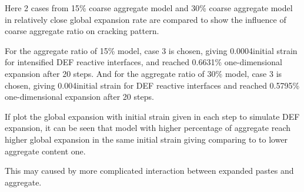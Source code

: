 Here 2 cases from 15\% coarse aggregate model and 30\% coarse aggregate model in relatively close global expansion rate are compared to show the influence of coarse aggregate ratio on cracking pattern.

For the aggregate ratio of 15\% model, case 3 is chosen, giving 0.0004initial strain for intensified DEF reactive interfaces, and reached 0.6631\% one-dimensional expansion after 20 steps. And for the aggregate ratio of 30\% model, case 3 is chosen, giving 0.004initial strain for DEF reactive interfaces and reached 0.5795\% one-dimensional expansion after 20 steps.

If plot the global expansion with initial strain given in each step to simulate DEF expansion, it can be seen that model with higher percentage of aggregate reach higher global expansion in the same initial strain giving comparing to to lower aggregate content one. %

This may caused by more complicated interaction between expanded pastes and aggregate.

\clearpage

